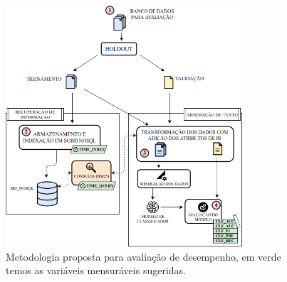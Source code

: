 \begin{figure}[H]
    \centering
    \includegraphics[width=0.8\textwidth]{img/diagrama_da_metodologia.png}
    \caption{Metodologia proposta para avaliação de desempenho, em verde temos as variáveis mensuráveis sugeridas.}
    \label{fig:diagrama-da-metodologia}
\end{figure}
